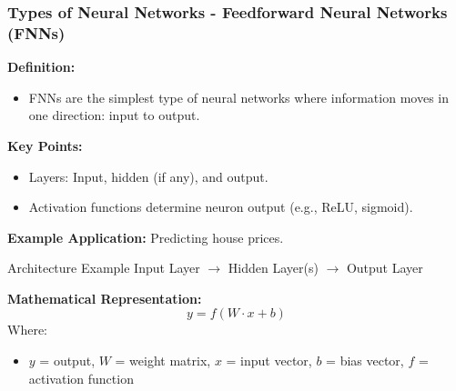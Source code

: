 \documentclass[aspectratio=169]{beamer}
\begin{document}
\begin{frame}[fragile]
    \frametitle{Types of Neural Networks - Feedforward Neural Networks (FNNs)}
    
    \textbf{Definition:}
    \begin{itemize}
        \item FNNs are the simplest type of neural networks where information moves in one direction: input to output.
    \end{itemize}
    
    \textbf{Key Points:}
    \begin{itemize}
        \item Layers: Input, hidden (if any), and output.
        \item Activation functions determine neuron output (e.g., ReLU, sigmoid).
    \end{itemize}
    
    \textbf{Example Application:} Predicting house prices.

    \begin{block}{Architecture Example}
    Input Layer $\rightarrow$ Hidden Layer(s) $\rightarrow$ Output Layer
    \end{block}
    
    \textbf{Mathematical Representation:}
    \begin{equation}
        y = f(W \cdot x + b)
    \end{equation}
    Where:
    \begin{itemize}
        \item \( y \) = output, \( W \) = weight matrix, \( x \) = input vector, \( b \) = bias vector, \( f \) = activation function
    \end{itemize}
\end{frame}
\end{document}
